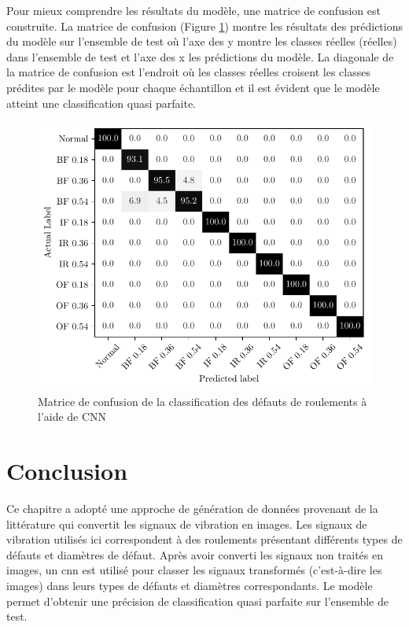 Pour mieux comprendre les résultats du modèle, une matrice de confusion est construite. La matrice de confusion (Figure \ref{fig:bearings_faults_classification_confusion_matrix}) montre les résultats des prédictions du modèle sur l'ensemble de test où l'axe des y montre les classes réelles (réelles) dans l'ensemble de test et l'axe des x les prédictions du modèle. La diagonale de la matrice de confusion est l'endroit où les classes réelles croisent les classes prédites par le modèle pour chaque échantillon et il est évident que le modèle atteint une classification quasi parfaite.

\begin{figure}[H]
    \centering
    \includegraphics{figures/cw_bearings_faults_classification.pdf}
    \caption{Matrice de confusion de la classification des défauts de roulements à l'aide de CNN}
    \label{fig:bearings_faults_classification_confusion_matrix}
\end{figure}

\section{Conclusion}
Ce chapitre a adopté une approche de génération de données provenant de la littérature qui convertit les signaux de vibration en images. Les signaux de vibration utilisés ici correspondent à des roulements présentant différents types de défauts et diamètres de défaut. Après avoir converti les signaux non traités en images, un \acrshort{cnn} est utilisé pour classer les signaux transformés (c'est-à-dire les images) dans leurs types de défauts et diamètres correspondants. Le modèle permet d'obtenir une précision de classification quasi parfaite sur l'ensemble de test.



